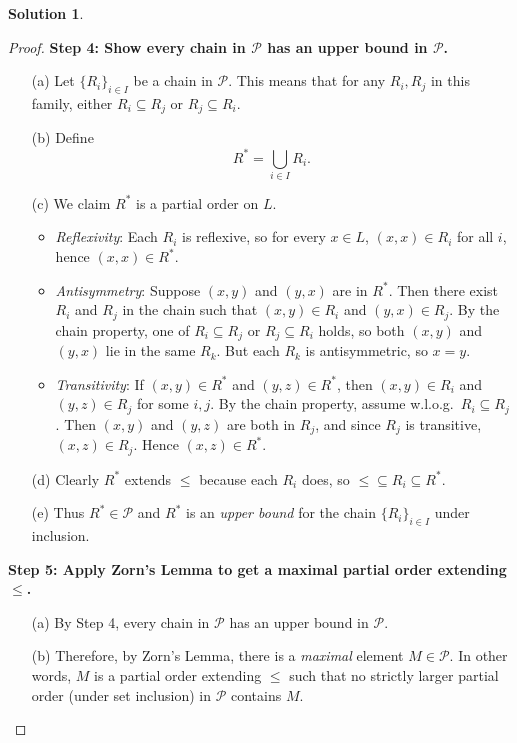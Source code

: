 \documentclass[12pt]{article}
\theoremstyle{definition} %
\newtheorem{solution}{Solution}
\theoremstyle{plain} %
\begin{document}
\begin{solution}
\begin{proof}
        \vspace{0.3cm}
        \textbf{Step 4: Show every chain in $\mathcal{P}$ has an upper bound in $\mathcal{P}$.}
        
        \begin{enumerate}
            \item[(a)] Let $\{R_i\}_{i \in I}$ be a chain in $\mathcal{P}$. This means that for any $R_i, R_j$ in this family, either $R_i \subseteq R_j$ or $R_j \subseteq R_i$.
            \item[(b)] Define
            \[
                R^* = \bigcup_{i \in I} R_i.
            \]
            \item[(c)] We claim $R^*$ is a partial order on $L$. 
            \begin{itemize}
                \item \emph{Reflexivity}: Each $R_i$ is reflexive, so for every $x \in L$, $(x,x)\in R_i$ for all $i$, hence $(x,x)\in R^*$.
                \item \emph{Antisymmetry}: Suppose $(x,y)$ and $(y,x)$ are in $R^*$. Then there exist $R_i$ and $R_j$ in the chain such that $(x,y)\in R_i$ and $(y,x)\in R_j$. By the chain property, one of $R_i \subseteq R_j$ or $R_j \subseteq R_i$ holds, so both $(x,y)$ and $(y,x)$ lie in the same $R_k$. But each $R_k$ is antisymmetric, so $x=y$.
                \item \emph{Transitivity}: If $(x,y)\in R^*$ and $(y,z)\in R^*$, then $(x,y)\in R_i$ and $(y,z)\in R_j$ for some $i,j$. By the chain property, assume w.l.o.g.\ $R_i \subseteq R_j$. Then $(x,y)$ and $(y,z)$ are both in $R_j$, and since $R_j$ is transitive, $(x,z)\in R_j$. Hence $(x,z)\in R^*$.
            \end{itemize}
            \item[(d)] Clearly $R^*$ extends $\leq$ because each $R_i$ does, so $\leq \subseteq R_i \subseteq R^*$.
            \item[(e)] Thus $R^* \in \mathcal{P}$ and $R^*$ is an \emph{upper bound} for the chain $\{R_i\}_{i\in I}$ under inclusion.
        \end{enumerate}
        
        \vspace{0.3cm}
        \textbf{Step 5: Apply Zorn's Lemma to get a maximal partial order extending $\leq$.}
        
        \begin{enumerate}
            \item[(a)] By Step 4, every chain in $\mathcal{P}$ has an upper bound in $\mathcal{P}$.
            \item[(b)] Therefore, by Zorn's Lemma, there is a \emph{maximal} element $M \in \mathcal{P}$. In other words, $M$ is a partial order extending $\leq$ such that no strictly larger partial order (under set inclusion) in $\mathcal{P}$ contains $M$.
        \end{enumerate}
        

\end{proof}
\end{solution}
\end{document}
